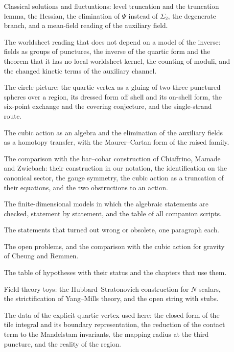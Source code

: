 \begin{description}
  \item[] Classical solutions and fluctuations: level truncation and the truncation lemma, the Hessian, the elimination of $\Psi$ instead of $\Sigma_2$, the degenerate branch, and a mean-field reading of the auxiliary field.

  \item[] The worldsheet reading that does not depend on a model of the inverse: fields as groups of punctures, the inverse of the quartic form and the theorem that it has no local worldsheet kernel, the counting of moduli, and the changed kinetic terms of the auxiliary channel.

  \item[] The circle picture: the quartic vertex as a gluing of two three-punctured spheres over a region, its dressed form off shell and its on-shell form, the six-point exchange and the covering conjecture, and the single-strand route.

  \item[] The cubic action as an \IBL{} algebra and the elimination of the auxiliary fields as a homotopy transfer, with the Maurer--Cartan form of the raised family.

  \item[] The comparison with the bar--cobar construction of Chiaffrino, Mamade and Zwiebach: their construction in our notation, the identification on the canonical sector, the gauge symmetry, the cubic action as a truncation of their equations, and the two obstructions to an action.

  \item[] The finite-dimensional models in which the algebraic statements are checked, statement by statement, and the table of all companion scripts.

  \item[] The statements that turned out wrong or obsolete, one paragraph each.

  \item[] The open problems, and the comparison with the cubic action for gravity of Cheung and Remmen.

  \item[] The table of hypotheses with their status and the chapters that use them.

  \item[] Field-theory toys: the Hubbard--Stratonovich construction for $N$ scalars, the strictification of Yang--Mills theory, and the open string with stubs.

  \item[] The data of the explicit quartic vertex used here: the closed form of the tile integral and its boundary representation, the reduction of the contact term to the Mandelstam invariants, the mapping radius at the third puncture, and the reality of the region.
\end{description}
